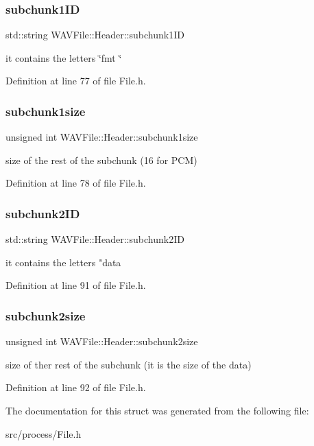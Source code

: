 \subsubsection{\texorpdfstring{subchunk1\+ID}{subchunk1ID}}
{\footnotesize\ttfamily std\+::string W\+A\+V\+File\+::\+Header\+::subchunk1\+ID}

it contains the letters \char`\"{}fmt \char`\"{} 

Definition at line 77 of file File.\+h.

\mbox{\label{struct_w_a_v_file_1_1_header_ae4e68dc34f2431942bbe6a5586a3ec55}} 
\subsubsection{\texorpdfstring{subchunk1size}{subchunk1size}}
{\footnotesize\ttfamily unsigned int W\+A\+V\+File\+::\+Header\+::subchunk1size}

size of the rest of the subchunk (16 for P\+CM) 

Definition at line 78 of file File.\+h.

\mbox{\label{struct_w_a_v_file_1_1_header_a8623063c7d187207e3bca18930adacb2}} 
\subsubsection{\texorpdfstring{subchunk2\+ID}{subchunk2ID}}
{\footnotesize\ttfamily std\+::string W\+A\+V\+File\+::\+Header\+::subchunk2\+ID}

it contains the letters "data 

Definition at line 91 of file File.\+h.

\mbox{\label{struct_w_a_v_file_1_1_header_ad5ed192e56a65a330d7320769f49c5bc}} 
\subsubsection{\texorpdfstring{subchunk2size}{subchunk2size}}
{\footnotesize\ttfamily unsigned int W\+A\+V\+File\+::\+Header\+::subchunk2size}

size of ther rest of the subchunk (it is the size of the data) 

Definition at line 92 of file File.\+h.



The documentation for this struct was generated from the following file\+:\begin{DoxyCompactItemize}
\item 
src/process/File.\+h\end{DoxyCompactItemize}
